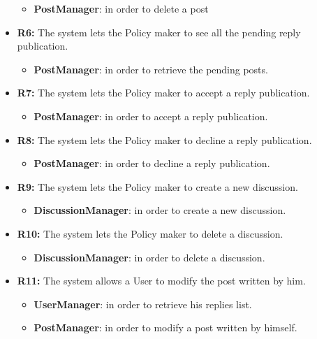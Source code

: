 \begin{itemize}
\begin{itemize}
    \item \textbf{PostManager}: in order to delete a post
\end{itemize}

\item \textbf{R6:} The system lets the Policy maker to see all the pending reply publication.

\begin{itemize}
    \item \textbf{PostManager}: in order to retrieve the pending posts. 
\end{itemize}

\item \textbf{R7:} The system lets the Policy maker to accept a reply publication.

\begin{itemize}
    \item \textbf{PostManager}: in order to accept a reply publication.
\end{itemize}

\item \textbf{R8:} The system lets the Policy maker to decline a reply publication.

\begin{itemize}
    \item \textbf{PostManager}: in order to decline a reply publication.
\end{itemize}

\item \textbf{R9:} The system lets the Policy maker to create a new discussion.

\begin{itemize}
    \item \textbf{DiscussionManager}: in order to create a new discussion.
\end{itemize}

\item \textbf{R10:} The system lets the Policy maker to delete a discussion.

\begin{itemize}
    \item \textbf{DiscussionManager}: in order to delete a discussion.
\end{itemize}

\item \textbf{R11:} The system allows a User to modify the post written by him.

\begin{itemize}
    \item \textbf{UserManager}: in order to retrieve his replies list.
    \item \textbf{PostManager}: in order to modify a post written by himself.
\end{itemize}


\end{itemize}
